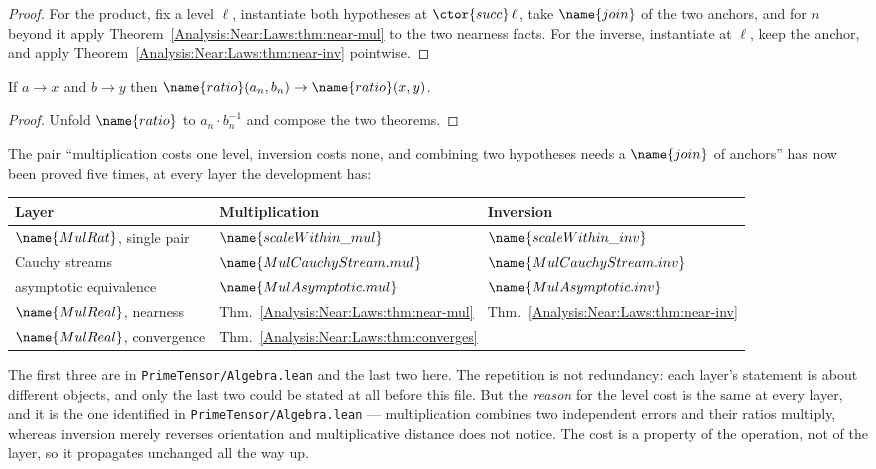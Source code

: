 \begin{proof}
For the product, fix a level $\ell$, instantiate both hypotheses at
$\ctor{succ}\,\ell$, take $\name{join}$ of the two anchors, and for $n$ beyond
it apply Theorem~\ref{Analysis:Near:Laws:thm:near-mul} to the two nearness
facts.  For the inverse, instantiate at $\ell$, keep the anchor, and apply
Theorem~\ref{Analysis:Near:Laws:thm:near-inv} pointwise.
\end{proof}

\begin{corollary}
\label{Analysis:Near:Laws:cor:ratio}
If $a \to x$ and $b \to y$ then
$\name{ratio}(a_n, b_n) \to \name{ratio}(x,y)$.
\end{corollary}

\begin{proof}
Unfold $\name{ratio}$ to $a_n \cdot b_n^{-1}$ and compose the two theorems.
\end{proof}

\begin{designnote}\label{Analysis:Near:Laws:note:motif}
The pair ``multiplication costs one level, inversion costs none, and combining
two hypotheses needs a $\name{join}$ of anchors'' has now been proved five
times, at every layer the development has:
\begin{center}
\small
\begin{tabular}{@{}lll@{}}
\hline
Layer & Multiplication & Inversion \\
\hline
$\name{MulRat}$, single pair
  & $\name{scaleWithin\_mul}$ & $\name{scaleWithin\_inv}$ \\
Cauchy streams
  & $\name{MulCauchyStream.mul}$ & $\name{MulCauchyStream.inv}$ \\
asymptotic equivalence
  & $\name{MulAsymptotic.mul}$ & $\name{MulAsymptotic.inv}$ \\
$\name{MulReal}$, nearness
  & Thm.~\ref{Analysis:Near:Laws:thm:near-mul}
  & Thm.~\ref{Analysis:Near:Laws:thm:near-inv} \\
$\name{MulReal}$, convergence
  & \multicolumn{2}{l}{Thm.~\ref{Analysis:Near:Laws:thm:converges}} \\
\hline
\end{tabular}
\end{center}
The first three are in \texttt{PrimeTensor/Algebra.lean} and the last two here.
The repetition is not redundancy: each layer's statement is about different
objects, and only the last two could be stated at all before this file.  But
the \emph{reason} for the level cost is the same at every layer, and it is the
one identified in \texttt{PrimeTensor/Algebra.lean} --- multiplication combines
two independent errors and their ratios multiply, whereas inversion merely
reverses orientation and multiplicative distance does not notice.  The cost is
a property of the operation, not of the layer, so it propagates unchanged all
the way up.
\end{designnote}

